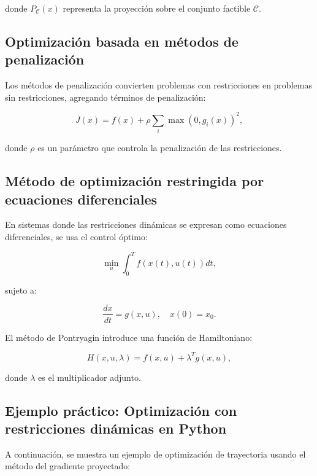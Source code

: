 \begin{itemize}
		donde \( P_{\mathcal{C}}(x) \) representa la proyección sobre el conjunto factible \( \mathcal{C} \).
		
		\subsection{Optimización basada en métodos de penalización}
		
		Los métodos de penalización convierten problemas con restricciones en problemas sin restricciones, agregando términos de penalización:
		
		\begin{equation}
			J(x) = f(x) + \rho \sum_i \max(0, g_i(x))^2,
		\end{equation}
		
		donde \( \rho \) es un parámetro que controla la penalización de las restricciones.
		
		\subsection{Método de optimización restringida por ecuaciones diferenciales}
		
		En sistemas donde las restricciones dinámicas se expresan como ecuaciones diferenciales, se usa el control óptimo:
		
		\begin{equation}
			\min_{u} \int_{0}^{T} f(x(t), u(t)) dt,
		\end{equation}
		
		sujeto a:
		
		\begin{equation}
			\frac{dx}{dt} = g(x, u), \quad x(0) = x_0.
		\end{equation}
		
		El método de Pontryagin introduce una función de Hamiltoniano:
		
		\begin{equation}
			H(x, u, \lambda) = f(x, u) + \lambda^T g(x, u),
		\end{equation}
		
		donde \( \lambda \) es el multiplicador adjunto.
		
		\subsection{Ejemplo práctico: Optimización con restricciones dinámicas en Python}
		
		A continuación, se muestra un ejemplo de optimización de trayectoria usando el método del gradiente proyectado:
		

\end{itemize}
